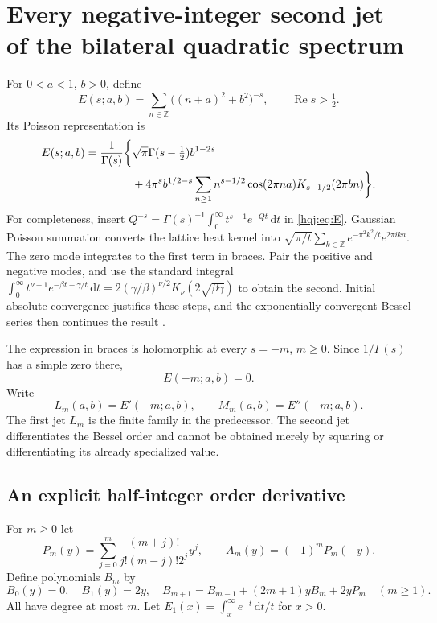 \documentclass[11pt,letterpaper]{article}
\numberwithin{equation}{section}
\theoremstyle{definition}
\newcommand{\Rea}{\operatorname{Re}}
\newcommand{\dd}{\,\mathrm{d}}
\newcommand{\Z}{\mathbb Z}
\begin{document}

\section{Every negative-integer second jet of the bilateral quadratic spectrum}
\label{hqj:sec:second}

For $0<a<1$, $b>0$, define
\begin{equation}\label{hqj:eq:E}
E(s;a,b)=\sum_{n\in\Z}\bigl((n+a)^2+b^2\bigr)^{-s},\qquad \Rea s>\tfrac12.
\end{equation}
Its Poisson representation is
\begin{align}
E(s;a,b)=\frac1{\Gamma(s)}\biggl\{&\sqrt\pi\Gamma(s-\tfrac12)b^{1-2s}
\notag\\
&+4\pi^s b^{1/2-s}\sum_{n\ge1}n^{s-1/2}\cos(2\pi na)
K_{s-1/2}(2\pi bn)\biggr\}.
\label{hqj:eq:Poisson}
\end{align}
For completeness, insert
$Q^{-s}=\Gamma(s)^{-1}\int_0^\infty t^{s-1}e^{-Qt}\dd t$
in \eqref{hqj:eq:E}. Gaussian Poisson summation converts the lattice
heat kernel into
$\sqrt{\pi/t}\sum_{k\in\Z}e^{-\pi^2k^2/t}e^{2\pi ika}$.
The zero mode integrates to the first term in braces. Pair the positive
and negative modes, and use the standard integral
$\int_0^\infty t^{\nu-1}e^{-\beta t-\gamma/t}\dd t
=2(\gamma/\beta)^{\nu/2}K_\nu(2\sqrt{\beta\gamma})$
to obtain the second. Initial absolute convergence justifies these
steps, and the exponentially convergent Bessel series then continues
the result \cite{bessel}.

The expression in braces is holomorphic at every $s=-m$, $m\ge0$.
Since $1/\Gamma(s)$ has a simple zero there,
\begin{equation}\label{hqj:eq:negative-zero}
E(-m;a,b)=0.
\end{equation}
Write
\[
L_m(a,b)=E'(-m;a,b),\qquad M_m(a,b)=E''(-m;a,b).
\]
The first jet $L_m$ is the finite family in the predecessor. The second
jet differentiates the Bessel order and cannot be obtained merely by
squaring or differentiating its already specialized value.

\subsection{An explicit half-integer order derivative}
For $m\ge0$ let
\begin{equation}\label{hqj:eq:PAB}
P_m(y)=\sum_{j=0}^m\frac{(m+j)!}{j!(m-j)!2^j}y^j,
\qquad A_m(y)=(-1)^mP_m(-y).
\end{equation}
Define polynomials $B_m$ by
\begin{equation}\label{hqj:eq:Brec}
B_0(y)=0,\quad B_1(y)=2y,\quad
B_{m+1}=B_{m-1}+(2m+1)yB_m+2yP_m\quad(m\ge1).
\end{equation}
All have degree at most $m$. Let
$E_1(x)=\int_x^\infty e^{-t}\dd t/t$ for $x>0$.
\end{document}
